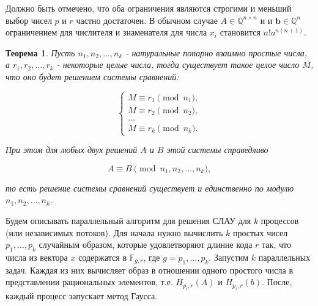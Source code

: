 \documentclass[master, och, diploma, times]{sty/SCWorks}
\theoremstyle{plain}
\newtheorem{thethm}{Теорема}[section]
\theoremstyle{definition}
\begin{document}
Должно быть отмечено, что оба ограничения являются строгими и меньший выбор чисел $p$ и $r$ частно достаточен. В обычном случае $A \in \mathbb{Q}^{n \times n}$ и и $\boldsymbol{b} \in \mathbb{Q}^{n}$ ограничением для числителя и знаменателя для числа $x_i$ становится $n!a^{n(n+1)}$. 

\begin{thethm}
Пусть $n_1,n_2,\dots, n_k$ - натуральные попарно взаимно простые числа, а $r_1,r_2,\dots,r_k$ - некоторые целые числа, тогда существует такое целое число $M$, что оно будет решением системы сравнений:

\begin{equation}
\begin{cases} 
M \equiv r_1 \pmod {n_1}, \\
M \equiv r_2 \pmod {n_2}, \\
\dots \\
M \equiv r_k \pmod {n_k}.
\end{cases}
\end{equation}

\noindent При этом для любых двух решений $A$ и $B$ этой системы справедливо

\begin{equation}
A \equiv B \pmod {n_1,n_2,\dots,n_k},
\end{equation}

\noindent то есть решение системы сравнений существует и единственно по модулю $n_1,n_2,\dots,n_k$.
\end{thethm}


Будем описывать параллельный алгоритм для решения СЛАУ для $k$ процессов (или независимых потоков). Для начала нужно вычислить $k$ простых чисел $p_1, \dots, p_k$ случайным образом, которые удовлетворяют длинне кода $r$ так, что числа из вектора $x$ содержатся в $\mathbb{F}_{g,r}$, где $g=p_1,\dots,p_k$. 
Запустим $k$ параллельных задач. Каждая из них вычисляет образ в отношении одного простого числа в представлении рациональных элементов, т.е. $H_{p_i,r}(A)$ и $H_{p_i,r}(b)$.
После, каждый процесс запускает метод Гаусса.
\end{document}
